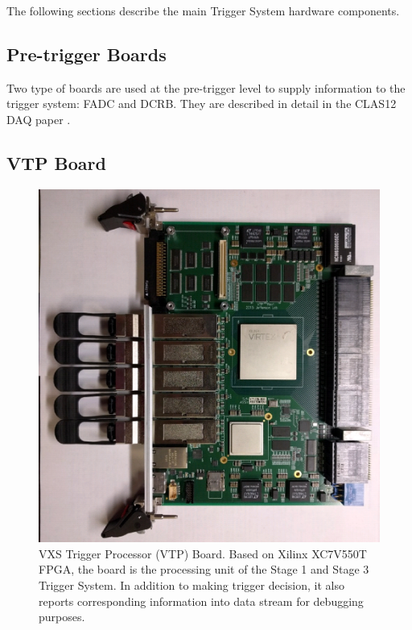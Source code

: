 The following sections describe the main Trigger System hardware components.


\subsection{Pre-trigger Boards}

Two type of boards are used at the pre-trigger level to supply information to the trigger system: FADC and DCRB. They are described in detail in the CLAS12 DAQ paper \cite{daq-ref}.

\subsection{VTP Board}
\label{sec:vtp_board}

\begin{figure}[hbt]
	\centering
	\includegraphics[width=1.0\columnwidth,keepaspectratio]{img/vtp_board.png}
	\caption{VXS Trigger Processor (VTP) Board. Based on Xilinx XC7V550T FPGA, the board is the processing unit of the Stage 1 and Stage 3 Trigger System. In addition to making trigger decision, it also reports corresponding information into data stream for debugging purposes.}
	\label{fig:vtp_board}
\end{figure}

